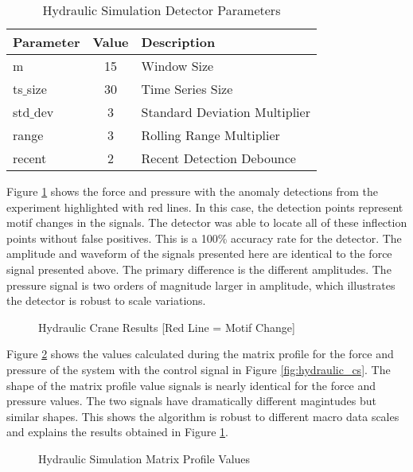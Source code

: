 \begin{table}[H]
\caption{Hydraulic Simulation Detector Parameters}
\begin{tabular}{|l|c|l|}
    \hline
	\textbf{Parameter} & \textbf{Value} & \textbf{Description} \\ \hline
	m & 15 & Window Size \\ \hline
	ts$\_$size & 30 & Time Series Size \\ \hline
	std$\_$dev & 3 & Standard Deviation Multiplier \\ \hline
	range & 3 & Rolling Range Multiplier\\ \hline
	recent & 2 & Recent Detection Debounce\\ \hline
\end{tabular}
\label{tab:hydraulic_sim_params}
\end{table}

Figure \ref{fig:hydraulic_result_fp} shows the force and pressure with the anomaly detections from the experiment highlighted with red lines. In this case, the detection points represent motif changes in the signals. The detector was able to locate all of these inflection points without false positives. This is a 100\% accuracy rate for the detector. The amplitude and waveform of the signals presented here are identical to the force signal presented above. The primary difference is the different amplitudes. The pressure signal is two orders of magnitude larger in amplitude, which illustrates the detector is robust to scale variations.

\begin{figure}[H]
    
    \caption{Hydraulic Crane Results [Red Line = Motif Change]}
    \label{fig:hydraulic_result_fp}
\end{figure}

Figure \ref{fig:hydraulic_mp_hist_fp} shows the values calculated during the matrix profile for the force and pressure of the system with the control signal in Figure \ref{fig:hydraulic_cs}. The shape of the matrix profile value signals is nearly identical for the force and pressure values. The two signals have dramatically different magintudes but similar shapes. This shows the algorithm is robust to different macro data scales and explains the results obtained in Figure \ref{fig:hydraulic_result_fp}.
\begin{figure}[H]
    
    \caption{Hydraulic Simulation Matrix Profile Values}
    \label{fig:hydraulic_mp_hist_fp}
\end{figure}


